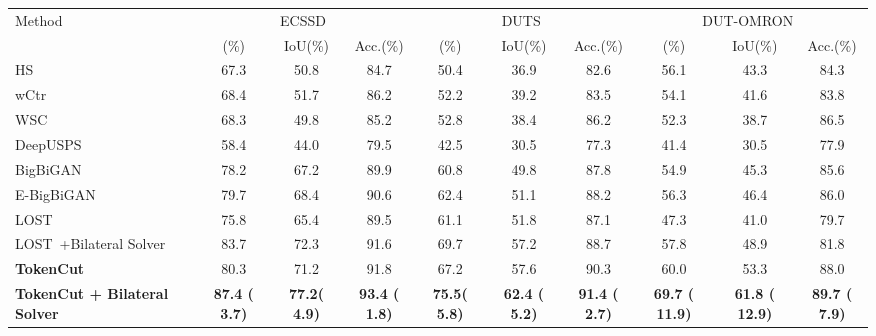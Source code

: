 \documentclass[twocolumn]{article}
\begin{document}
\begin{table*}[!ht]
{\begin{tabular}{l|ccc|ccc|ccc}
\multirow{2}{*}{Method} & \multicolumn{3}{c|}{ECSSD~\cite{shi2015hierarchical}} & \multicolumn{3}{c|}{DUTS~\cite{wang2017learning}}  & \multicolumn{3}{c}{DUT-OMRON~\cite{yang2013saliency}} \\
                        & \multicolumn{1}{c}{(\%)} & \multicolumn{1}{c}{IoU(\%)} & \multicolumn{1}{c|}{Acc.(\%)} & \multicolumn{1}{c}{(\%)} & \multicolumn{1}{c}{IoU(\%)} & \multicolumn{1}{c|}{Acc.(\%)} & \multicolumn{1}{c}{(\%)} & \multicolumn{1}{c}{IoU(\%)} & \multicolumn{1}{c}{Acc.(\%)} \\
\midrule
HS~\cite{yan2013hierarchical}  & 67.3  & 50.8  & 84.7  & 50.4      & 36.9   & 82.6  & 56.1  & 43.3   & 84.3 \\
wCtr~\cite{zhu2014saliency}    & 68.4  & 51.7  & 86.2  & 52.2      & 39.2   & 83.5  & 54.1  & 41.6   & 83.8 \\
WSC~\cite{li2015weighted}      & 68.3  & 49.8  & 85.2  & 52.8      & 38.4   & 86.2  & 52.3  & 38.7   & 86.5 \\
DeepUSPS~\cite{nguyen2019deepusps} & 58.4  & 44.0  & 79.5  & 42.5      & 30.5   & 77.3  & 41.4  & 30.5   & 77.9 \\
BigBiGAN~\cite{voynov2021object}  & 78.2  & 67.2  & 89.9  & 60.8      & 49.8   & 87.8  & 54.9  & 45.3   & 85.6 \\
E-BigBiGAN~\cite{voynov2021object}  & 79.7  & 68.4  & 90.6  & 62.4      & 51.1   & 88.2  & 56.3  & 46.4   & 86.0 \\
LOST~\cite{simeoni2021localizing,shen2021learning}   & 75.8  & 65.4  & 89.5  & 61.1      & 51.8   & 87.1  & 47.3  & 41.0   & 79.7 \\
LOST~\cite{simeoni2021localizing,shen2021learning}+Bilateral Solver~\cite{barron2016fast}   & 83.7  & 72.3  & 91.6  & 69.7      & 57.2   & 88.7  & 57.8  & 48.9   & 81.8 \\                   
\midrule
\bf TokenCut & 80.3	& 71.2	& 91.8	& 67.2 &	57.6 & 	90.3 &	60.0 &	53.3 &	88.0 \\
\bf TokenCut + Bilateral Solver~\cite{barron2016fast} & \bf 87.4 (\textcolor{cssgreen}{ \bf 3.7})& \bf 77.2(\textcolor{cssgreen}{ \bf 4.9}) & \bf 93.4 (\textcolor{cssgreen}{ \bf 1.8})& \bf 75.5(\textcolor{cssgreen}{ \bf 5.8}) &	\bf 62.4 (\textcolor{cssgreen}{ \bf 5.2})& \bf 91.4 (\textcolor{cssgreen}{ \bf 2.7})& \bf 69.7 (\textcolor{cssgreen}{ \bf 11.9}) & \bf 61.8 (\textcolor{cssgreen}{ \bf 12.9})& \bf 89.7 (\textcolor{cssgreen}{ \bf 7.9})\\

\bottomrule
\end{tabular}
}
\label{tab:salient_detection}

\end{table*}
\end{document}
